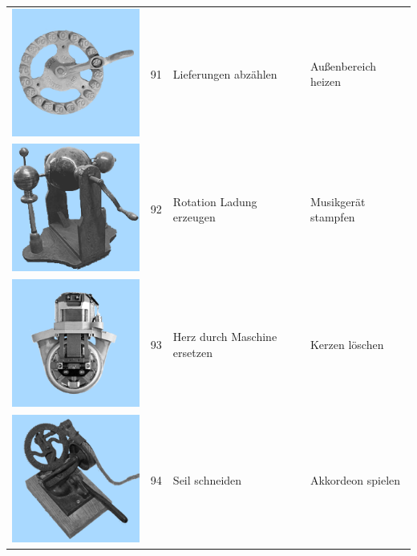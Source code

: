 \documentclass[
  english,
  doc,12pt,twoside,floatsintext]{apa7}
\begin{document}
\begin{center}
\begin{ThreePartTable}
\begin{longtable}{llll}
\includegraphics[valign=c, scale=0.19]{../materials/unfamiliar/91.png} & 91 & Lieferungen abzählen & Außenbereich heizen\\
\includegraphics[valign=c, scale=0.19]{../materials/unfamiliar/92.png} & 92 & Rotation Ladung erzeugen & Musikgerät stampfen\\
\includegraphics[valign=c, scale=0.19]{../materials/unfamiliar/93.png} & 93 & Herz durch Maschine ersetzen & Kerzen löschen\\
\includegraphics[valign=c, scale=0.19]{../materials/unfamiliar/94.png} & 94 & Seil schneiden & Akkordeon spielen\\

\end{longtable}
\end{ThreePartTable}
\end{center}
\end{document}
